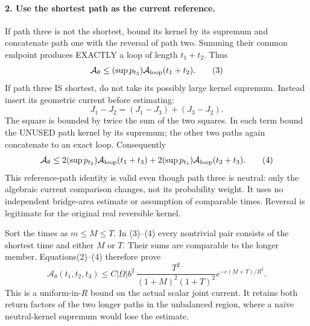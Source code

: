 \documentclass[11pt]{article}
\begin{document}
\paragraph{2. Use the shortest path as the current reference.}
If path three is not the shortest, bound its kernel by its supremum and
concatenate path one with the reversal of path two. Summing their common
endpoint produces EXACTLY a loop of length $t_1+t_2$. Thus
\[
 \mathcal A_\theta\le (\sup p_{t_3})
                        \mathcal A_{\rm loop}(t_1+t_2).           \tag{3}
\]
If path three IS shortest, do not take its possibly large kernel supremum.
Instead insert its geometric current before estimating:
\[
 J_1-J_2=(J_1-J_3)+(J_3-J_2).
\]
The square is bounded by twice the sum of the two squares. In each term
bound the UNUSED path kernel by its supremum; the other two paths again
concatenate to an exact loop. Consequently
\[
 \mathcal A_\theta\le2(\sup p_{t_2})\mathcal A_{\rm loop}(t_1+t_3)
             +2(\sup p_{t_1})\mathcal A_{\rm loop}(t_2+t_3).       \tag{4}
\]
This reference-path identity is valid even though path three is neutral:
only the algebraic current comparison changes, not its probability weight.
It uses no independent bridge-area estimate or assumption of comparable
times. Reversal is legitimate for the original real reversible kernel.

Sort the times as $m\le M\le T$. In (3)--(4) every nontrivial pair consists
of the shortest time and either $M$ or $T$. Their sums are comparable to
the longer member. Equations(2)--(4) therefore prove
\[
 \boxed{\mathcal A_\theta(t_1,t_2,t_3)
 \le C|\Omega|b^2\,
 \frac{T^2}{(1+M)^2(1+T)^2}
             e^{-c(M+T)/R^2}.}                                   \tag{5}
\]
This is a uniform-in-$R$ bound on the actual scalar joint current. It
retains both return factors of the two longer paths in the unbalanced
region, where a naive neutral-kernel supremum would lose the estimate.
\end{document}
